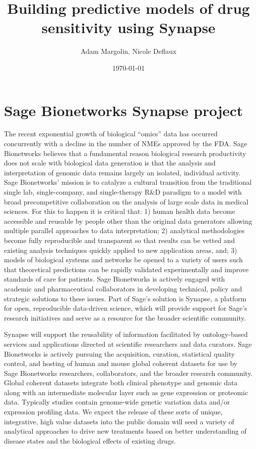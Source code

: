 \documentclass[10pt]{article}
\title{Building predictive models of drug sensitivity using Synapse}
\author{Adam Margolin, Nicole Deflaux}
\date{\today}
\begin{document}
\maketitle

\section{Sage Bionetworks Synapse project}

The recent exponential growth of biological ``omics'' data has occurred
concurrently with a decline in the number of NMEs approved by the FDA. Sage
Bionetworks believes that a fundamental reason biological research
productivity does not scale with biological data generation is that the
analysis and interpretation of genomic data remains largely an isolated,
individual activity. Sage Bionetworks' mission is to catalyze a cultural
transition from the traditional single lab, single-company, and
single-therapy R\&D paradigm to a model with broad precompetitive
collaboration on the analysis of large scale data in medical sciences. For
this to happen it is critical that: 1) human health data become accessible
and reusable by people other than the original data generators allowing
multiple parallel approaches to data interpretation; 2) analytical
methodologies become fully reproducible and transparent so that results can
be vetted and existing analysis techniques quickly applied to new
application areas, and; 3) models of biological systems and networks be
opened to a variety of users such that theoretical predictions can be
rapidly validated experimentally and improve standards of care for
patients. Sage Bionetworks is actively engaged with academic and
pharmaceutical collaborators in developing technical, policy and strategic
solutions to these issues. Part of Sage's solution is Synapse, a platform
for open, reproducible data-driven science, which will provide support for
Sage's research initiatives and serve as a resource for the broader
scientific community.

Synapse will support the reusability of information facilitated by
ontology-based services and applications directed at scientific researchers
and data curators. Sage Bionetworks is actively pursuing the acquisition,
curation, statistical quality control, and hosting of human and mouse global
coherent datasets for use by Sage Bionetworks researchers, collaborators,
and the broader research community. Global coherent datasets integrate both
clinical phenotype and genomic data along with an intermediate molecular
layer such as gene expression or proteomic data. Typically studies contain
genome-wide genetic variation data and/or expression profiling data. We
expect the release of these sorts of unique, integrative, high value
datasets into the public domain will seed a variety of analytical approaches
to drive new treatments based on better understanding of disease states and
the biological effects of existing drugs.
\end{document}
